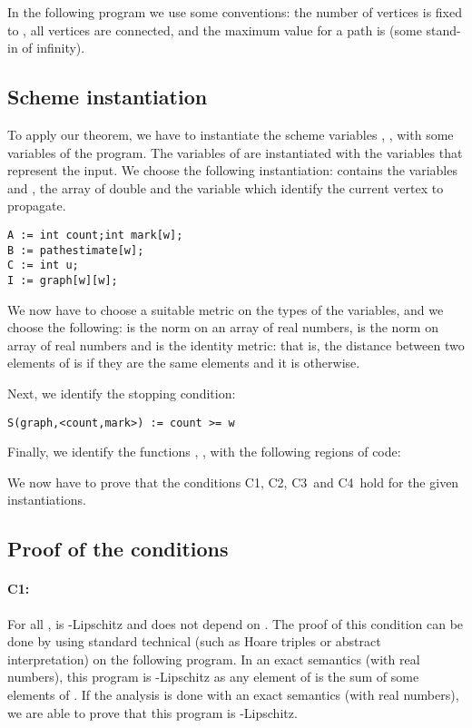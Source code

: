 \documentclass[copyright,creativecommons]{eptcs}
\newcommand{\Cone}{C1}
\newcommand{\Ctwo}{C2}
\newcommand{\Cthree}{C3}
\newcommand{\Cfour}{C4}
\begin{document}
In the following program we use some conventions: the number of
vertices is  fixed to , all 
vertices are connected,  and the maximum  value for a path is  (some
stand-in of infinity).



{}


\subsection{Scheme instantiation}
To apply our theorem, we have to instantiate the scheme variables  , ,  with some variables of the program.  The variables of  are instantiated with the variables that represent the input. 
We choose the following instantiation:  contains the variables  and ,  the
array of double  and  the variable  which identify the
current vertex to propagate. 

{\scriptsize\begin{lstlisting}
A := int count;int mark[w];
B := pathestimate[w];
C := int u;
I := graph[w][w];
\end{lstlisting}}

We now have to choose a suitable metric on the types of the variables, and we choose the following:  is the  norm on an
array of real numbers,  is the  norm on array of real numbers  and  is the identity metric: that is, the
distance between two elements of  is   if they are the same
elements and it is  otherwise.  

Next, we  identify the stopping condition:
\begin{lstlisting}
S(graph,<count,mark>) := count >= w
\end{lstlisting}
Finally, we identify the functions , , 
with the following regions of code:
{}

We now have to prove that the conditions \Cone, \Ctwo, \Cthree\, and
\Cfour\, hold for the given instantiations. 

\subsection{Proof of the conditions}

\paragraph{\Cone: }
For all ,  is  -Lipschitz and  does not depend on .
The proof of this condition can be done by using standard technical (such as Hoare
triples or abstract interpretation) on the following program.
{}
In an exact semantics (with real numbers), this program is -Lipschitz as any element of  is  the sum of some elements of .
If the analysis is done with an exact semantics (with real numbers), we
are able to prove that this program is -Lipschitz.
\end{document}

